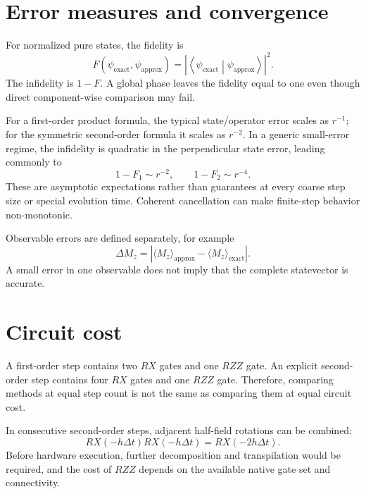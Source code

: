 \documentclass[11pt,a4paper]{article}
\newcommand{\braket}[2]{\left\langle#1\middle|#2\right\rangle}
\begin{document}
\section{Error measures and convergence}

For normalized pure states, the fidelity is
\begin{equation}
F(\psi_{\mathrm{exact}},\psi_{\mathrm{approx}})
=\left|\braket{\psi_{\mathrm{exact}}}{\psi_{\mathrm{approx}}}\right|^2.
\end{equation}
The infidelity is $1-F$. A global phase leaves the fidelity equal to one even though direct component-wise comparison may fail.

For a first-order product formula, the typical state/operator error scales as $r^{-1}$; for the symmetric second-order formula it scales as $r^{-2}$. In a generic small-error regime, the infidelity is quadratic in the perpendicular state error, leading commonly to
\begin{equation}
1-F_1\sim r^{-2},\qquad 1-F_2\sim r^{-4}.
\end{equation}
These are asymptotic expectations rather than guarantees at every coarse step size or special evolution time. Coherent cancellation can make finite-step behavior non-monotonic.

Observable errors are defined separately, for example
\begin{equation}
\Delta M_z=
\left|\langle M_z\rangle_{\mathrm{approx}}-
\langle M_z\rangle_{\mathrm{exact}}\right|.
\end{equation}
A small error in one observable does not imply that the complete statevector is accurate.

\section{Circuit cost}

A first-order step contains two $RX$ gates and one $RZZ$ gate. An explicit second-order step contains four $RX$ gates and one $RZZ$ gate. Therefore, comparing methods at equal step count is not the same as comparing them at equal circuit cost.

In consecutive second-order steps, adjacent half-field rotations can be combined:
\begin{equation}
RX(-h\Delta t)RX(-h\Delta t)=RX(-2h\Delta t).
\end{equation}
Before hardware execution, further decomposition and transpilation would be required, and the cost of $RZZ$ depends on the available native gate set and connectivity.
\end{document}
